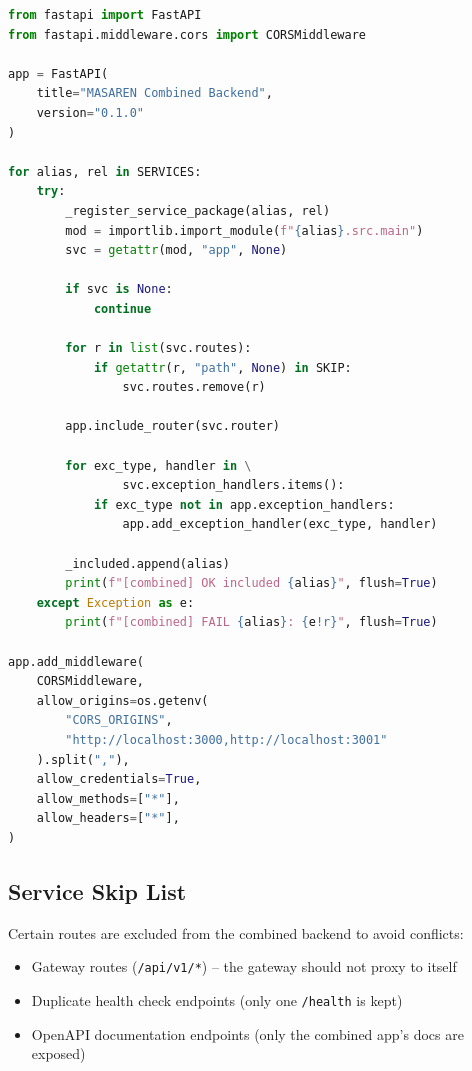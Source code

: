 \begin{lstlisting}[language=Python, caption=Route Merging]
from fastapi import FastAPI
from fastapi.middleware.cors import CORSMiddleware

app = FastAPI(
    title="MASAREN Combined Backend",
    version="0.1.0"
)

for alias, rel in SERVICES:
    try:
        _register_service_package(alias, rel)
        mod = importlib.import_module(f"{alias}.src.main")
        svc = getattr(mod, "app", None)

        if svc is None:
            continue

        for r in list(svc.routes):
            if getattr(r, "path", None) in SKIP:
                svc.routes.remove(r)

        app.include_router(svc.router)

        for exc_type, handler in \
                svc.exception_handlers.items():
            if exc_type not in app.exception_handlers:
                app.add_exception_handler(exc_type, handler)

        _included.append(alias)
        print(f"[combined] OK included {alias}", flush=True)
    except Exception as e:
        print(f"[combined] FAIL {alias}: {e!r}", flush=True)

app.add_middleware(
    CORSMiddleware,
    allow_origins=os.getenv(
        "CORS_ORIGINS",
        "http://localhost:3000,http://localhost:3001"
    ).split(","),
    allow_credentials=True,
    allow_methods=["*"],
    allow_headers=["*"],
)
\end{lstlisting}

\subsection{Service Skip List}

Certain routes are excluded from the combined backend to avoid conflicts:
\begin{itemize}
  \item Gateway routes (\texttt{/api/v1/*}) -- the gateway should not proxy to itself
  \item Duplicate health check endpoints (only one \texttt{/health} is kept)
  \item OpenAPI documentation endpoints (only the combined app's docs are exposed)
\end{itemize}

\clearpage

